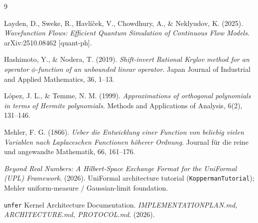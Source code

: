 \documentclass[11pt, a4paper]{article}
\begin{document}
\vspace{1em}
\begin{thebibliography}{9}

Layden, D., Sweke, R., Havl\'i\v{c}ek, V., Chowdhury, A., \& Neklyudov, K.
(2025). \textit{Wavefunction Flows: Efficient Quantum Simulation of Continuous
Flow Models}. arXiv:2510.08462 [quant-ph].

Hashimoto, Y., \& Nodera, T. (2019). \textit{Shift-invert Rational Krylov
method for an operator $\phi$-function of an unbounded linear operator}.
Japan Journal of Industrial and Applied Mathematics, 36, 1--13.

L\'opez, J. L., \& Temme, N. M. (1999). \textit{Approximations of orthogonal
polynomials in terms of Hermite polynomials}. Methods and Applications of
Analysis, 6(2), 131--146.

Mehler, F. G. (1866). \textit{Ueber die Entwicklung einer Function von
beliebig vielen Variablen nach Laplaceschen Functionen h\"oherer Ordnung}.
Journal f\"ur die reine und angewandte Mathematik, 66, 161--176.

\textit{Beyond Real Numbers: A Hilbert-Space Exchange Format for the UniFormal
(UPL) Framework}. (2026). UniFormal architecture tutorial
(\texttt{Kopperman\textunderscore Tutorial}); Mehler uniform-measure /
Gaussian-limit foundation.

\texttt{unfer} Kernel Architecture Documentation.
\textit{IMPLEMENTATION\textunderscore PLAN.md, ARCHITECTURE.md, PROTOCOL.md}.
(2026).

\end{thebibliography}
\end{document}
